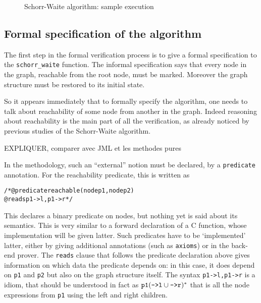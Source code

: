 \begin{figure}[t]
\begin{center}
\begin{picture}
\end{picture}\label{figure}
\end{center}
\caption{Schorr-Waite algorithm: sample execution}
\label{fig:algo}
\end{figure}

\subsection{Formal specification of the algorithm}

The first step in the formal verification process is to give a formal
specification to the \verb|schorr_waite| function. The informal
specification says that every node in the graph, reachable from the
root node, must be marked. Moreover the graph structure must be
restored to its initial state.

So it appears immediately that to formally specify the algorithm, one
needs to talk about reachability of some node from another in the
graph. Indeed reasoning about reachability is the main part of all the
verification, as already noticed by previous studies of the
Schorr-Waite algorithm.

{\Huge EXPLIQUER, comparer avec JML et les methodes pures}

In the \caduceus{} methodology, such an ``external'' notion must be
declared, by a \verb|predicate| annotation. For the reachability
predicate, this is written as
\begin{alltt}\begin{slshape}
/*@ predicate reachable (node p1, node p2) 
  @   reads p1->l,p1->r */
\end{slshape}\end{alltt}
This declares a binary predicate on nodes, but nothing yet is
said about its semantics. This is very similar to a forward
declaration of a C function, whose implementation will be given
latter. Such predicates have to be `implemented' latter, either
by giving additional \caduceus{} annotations (such as \verb|axioms|)
or in the back-end prover. 
The \texttt{reads} clause that follows the predicate
declaration above gives information on which data the predicate
depends on: in this case, it does depend on \verb|p1| and
\verb|p2| but also on the graph structure itself. The syntax
\verb|p1->l,p1->r| is a \caduceus{} idiom, that should be understood
in fact as $\verb|p1| (\verb|->l| \cup \verb|->r|)^*$ that is all the
node expressions from \verb|p1| using the left and right children.

